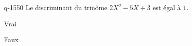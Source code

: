 \begin{truefalse}{q-1550}
Le discriminant du trinôme $2X^2-5X+3$ est égal à $1$.
\item* Vrai
\item Faux
\end{truefalse}

